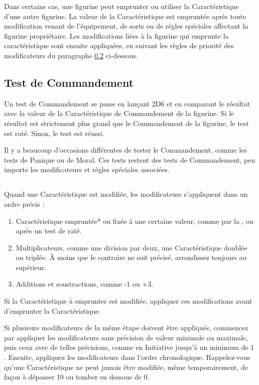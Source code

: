Dans certains cas,  une figurine peut emprunter ou utiliser la Caractéristique d'une autre figurine. La valeur de la Caractéristique est empruntée après toute modification venant de l'équipement, de sorts ou de règles spéciales affectant la figurine propriétaire. Les modifications liées à la figurine qui emprunte la caractéristique sont ensuite appliquées, en suivant les règles de priorité des modificateurs du paragraphe \ref{priority_of_modifiers} ci-dessous.

\subsection{Test de Commandement}

Un test de Commandement se passe en lançant 2D6 et en comparant le résultat avec la valeur de la Caractéristique de Commandement de la figurine. Si le résultat est strictement plus grand que le Commandement de la figurine, le test est raté. Sinon, le test est réussi. 

Il y a beaucoup d'occasions différentes de tester le Commandement, comme les tests de Panique ou de Moral. Ces tests restent des tests de Commandement, peu importe les modificateurs et règles spéciales associées.

\subsection[Priorité des modificateurs]{}
\label{priority_of_modifiers}

Quand une Caractéristique est modifiée, les modificateurs s'appliquent dans un ordre précis :
\begin{enumerate}
\item Caractéristique empruntée* ou fixée à une certaine valeur, comme par la \inspiringpresence{}, ou après un test de \fear{} raté.
\item Multiplicateurs, comme une division par deux, une Caractéristique doublée ou triplée. À moins que le contraire ne soit précisé, arrondissez toujours au supérieur.
\item Additions et soustractions, comme -1 ou +3.
\end{enumerate}
\noindent * Si la Caractéristique à emprunter est modifiée, appliquer ces modifications avant d'emprunter la Caractéristique. 

Si plusieurs modificateurs de la même étape doivent être appliqués, commencez par appliquer les modificateurs sans précision de valeur minimale ou maximale, puis ceux avec de telles précisions, comme  en Initiative jusqu'à un minimum de 1 \og{}. Ensuite, appliquez les modificateurs dans l'ordre chronologique. Rappelez-vous qu'une Caractéristique ne peut jamais être modifiée, même temporairement, de façon à dépasser 10 ou tomber en dessous de 0.

